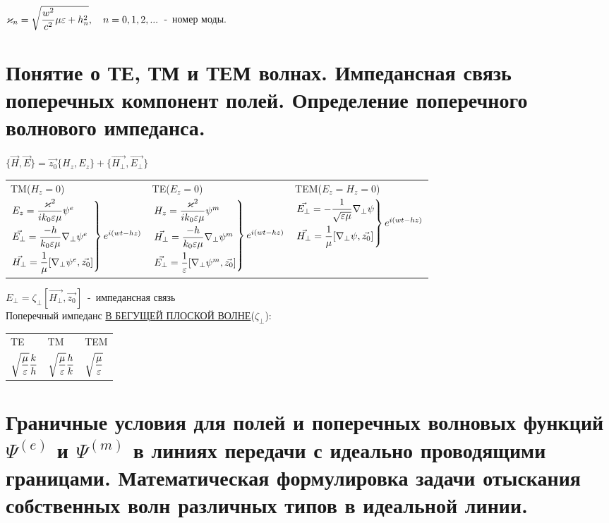 \begin{multicols*}{2}
		$\varkappa_n=\sqrt{\dfrac{w^2}{c^2}\mu\varepsilon+h_n^2}, \quad n=0,1,2,...$~-~номер моды.
		
		\section{Понятие о ТЕ, ТМ и ТЕМ волнах. Импедансная связь поперечных компонент полей. Определение поперечного волнового импеданса. }
		
		$\{\vec{H},\vec{E}\}=\vec{z_0}\{{H_z},{E_z}\}+\{\vec{H_\perp},\vec{E_\perp}\}$ \\
		\begin{tabular}{l l l}
			TM($H_z=0$) & TE($E_z=0$) & TEM($E_z=H_z=0$) \\
			$\begin{rcases}
				E_z=\dfrac{\varkappa^2}{ik_0\varepsilon\mu}\psi^e \\
				\vec{E_\perp} = \dfrac{-h}{k_0\varepsilon\mu}\nabla_\perp\psi^e \\
				\vec{H_\perp}=\dfrac1{\mu}[\nabla_\perp\psi^e,\vec{z_0}]
			\end{rcases} e^{i(wt-hz)}$ & 
			$\begin{rcases}
				H_z=\dfrac{\varkappa^2}{ik_0\varepsilon\mu}\psi^m \\
				\vec{H_\perp} = \dfrac{-h}{k_0\varepsilon\mu}\nabla_\perp\psi^m \\
				\vec{E_\perp}=\dfrac1{\varepsilon}[\nabla_\perp\psi^m,\vec{z_0}]
			\end{rcases} e^{i(wt-hz)}$ & 
			$\begin{rcases}
				\vec{E_\perp} =-\dfrac1{\sqrt{\varepsilon\mu}}\nabla_\perp\psi \\
				\vec{H_\perp}=\dfrac1{\mu}[\nabla_\perp\psi,\vec{z_0}]
			\end{rcases} e^{i(wt-hz)}$ \\
		\end{tabular}
		$E_\perp=\zeta_\perp[\vec{H_\perp},\vec{z_0}]$~-~импедансная связь \\
		Поперечный импеданс \underline{В БЕГУЩЕЙ ПЛОСКОЙ ВОЛНЕ}($\zeta_\perp$): \\
		\begin{tabular}{l l l}
			TE & TM & TEM \\
			$\sqrt{\dfrac{\mu}{\varepsilon}}\dfrac kh$ & $\sqrt{\dfrac{\mu}{\varepsilon}}\dfrac hk$ & $\sqrt{\dfrac{\mu}{\varepsilon}}$ \\
		\end{tabular}
		
		\section{Граничные условия для полей и поперечных волновых функций $\Psi^{(e)}$ и $\Psi^{(m)}$ в линиях передачи с идеально проводящими границами. Математическая формулировка задачи отыскания собственных волн различных типов в идеальной линии.}
		

\end{multicols*}
